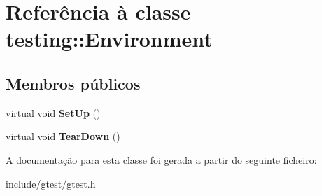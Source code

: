 \hypertarget{classtesting_1_1Environment}{\section{Referência à classe testing\-:\-:Environment}
\label{classtesting_1_1Environment}
}
\subsection*{Membros públicos}
\begin{DoxyCompactItemize}
\item 
\hypertarget{classtesting_1_1Environment_a1bf8cafaa9d4eba9feb98655ee434eb3}{virtual void {\bfseries Set\-Up} ()}\label{classtesting_1_1Environment_a1bf8cafaa9d4eba9feb98655ee434eb3}

\item 
\hypertarget{classtesting_1_1Environment_a039bdaa705c46b9b88234cf4d3bb6254}{virtual void {\bfseries Tear\-Down} ()}\label{classtesting_1_1Environment_a039bdaa705c46b9b88234cf4d3bb6254}

\end{DoxyCompactItemize}


A documentação para esta classe foi gerada a partir do seguinte ficheiro\-:\begin{DoxyCompactItemize}
\item 
include/gtest/gtest.\-h\end{DoxyCompactItemize}
